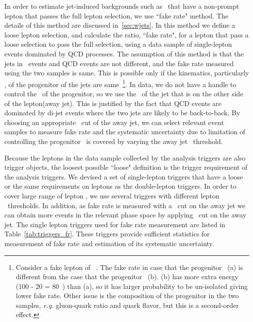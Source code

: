 In order to estimate jet-induced backgrounds such as \Wjets\ that have a non-prompt 
lepton that passes the full lepton selection, we use ``fake rate" method.  
The details of this method are discussed in~\ref{sec:wjets}. 
In this method we define a loose lepton selection, and calculate the ratio, 
``fake rate", for a lepton that pass a loose selection to pass the full selection, 
using a data sample of single-lepton events dominated by QCD processes. 
The assumption of this method is that the jets in \Wjets\ events 
and QCD events are not different, and the fake rate measured using the two samples is same. 
This is possible only if the kinematics, particularly \pt, of the progenitor 
of the jets are same~\footnote{Consider a fake lepton of ~\GeV. 
The fake rate in case that the progenitor ~\GeV(a) is 
different from the case that the progenitor ~\GeV(b). 
(b) has more extra energy (100 - 20 = 80~\GeV) than (a), 
so it has larger probability to be un-isolated giving lower fake rate.
Other issue is the composition of the progenitor in the two samples,
\textit{e.g.} gluon-quark ratio and quark flavor, 
but this is a second-order effect.}.
In data, we do not have a handle to control the \pt\ of the progenitor,
so we use the \pt\ of the jet that is on the other side of the lepton(away jet).  
This is justified by the fact that QCD events are dominated by 
di-jet events where the two jets are likely to be back-to-back. 
By choosing an appropriate \pt\ cut of the away jet, 
we can select relevant event samples to measure fake rate
and the systematic uncertainty due to limitation of controlling 
the progenitor \pt\ is covered by varying the away jet \pt\ threshold.


Because the leptons in the data sample collected by the analysis triggers 
are also trigger objects, the loosest possible 
``loose" definition is the trigger requirement of the analysis triggers.
We devised a set of single-lepton triggers that have a loose or the same requirements 
on leptons as the double-lepton triggers. 
In order to cover large range of lepton \pt, 
we use several triggers with different lepton \pt\ thresholds.
In addition, as fake rate is measured with a \pt\ cut on the away jet 
we can obtain more events in the relevant phase space
by applying \pt\ cut on the away jet. 
The single lepton triggers used for fake rate measurement are listed in 
Table~\ref{tab:triggers_fr}. These triggers provide sufficient statistics 
for measurement of fake rate and estimation of its systematic uncertainty.     


